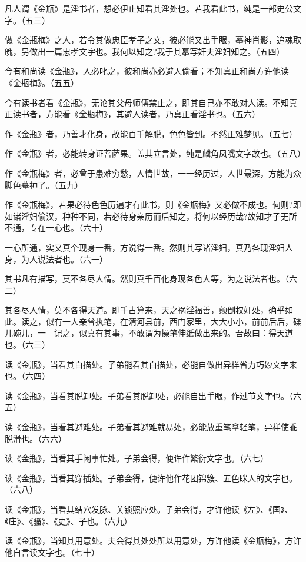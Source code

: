 \begin{showcontents}{}
{凡人谓《金瓶》是淫书者，想必伊止知看其淫处也。若我看此书，纯是一部史公文字。（五三）

做《金瓶梅》之人，若令其做忠臣孝子之文，彼必能又出手眼，摹神肖影，追魂取魄，另做出一篇忠孝文字也。我何以知之?我于其摹写奸夫淫妇知之。（五四）

今有和尚读《金瓶》，人必叱之，彼和尚亦必避人偷看；不知真正和尚方许他读《金瓶梅》。（五五）

今有读书者看《金瓶》，无论其父母师傅禁止之，即其自己亦不敢对人读。不知真正读书者，方能看《金瓶梅》，其避人读者，乃真正看淫书也。（五六）

作《金瓶》者，乃善才化身，故能百千解脱，色色皆到。不然正难梦见。（五七）

作《金瓶》者，必能转身证菩萨果。盖其立言处，纯是麟角凤嘴文字故也。（五八）

作《金瓶梅》者，必曾于患难穷愁，人情世故，一一经历过，人世最深，方能为众脚色摹神了。（五九）

作《金瓶梅》，若果必待色色历遍才有此书，则《金瓶梅》又必做不成也。何则?即如诸淫妇偷汉，种种不同，若必待身亲历而后知之，将何以经历哉?故知才子无所不通，专在一心也。（六十）

一心所通，实又真个现身一番，方说得一番。然则其写诸淫妇，真乃各现淫妇人身，为人说法者也。（六一）

其书凡有描写，莫不各尽人情。然则真千百化身现各色人等，为之说法者也。（六二）

其各尽人情，莫不各得天道。即千古算来，天之祸淫福善，颠倒权奸处，确乎如此。读之，似有一人亲曾执笔，在清河县前，西门家里，大大小小，前前后后，碟儿碗儿，一—记之，似真有其事，不敢谓为操笔伸纸做出来的。吾故曰：得天道也。（六三）

读《金瓶》，当看其白描处。子弟能看其白描处，必能自做出异样省力巧妙文字来也。（六四）

读《金瓶》，当看其脱卸处。子弟看其脱卸处，必能自出手眼，作过节文字也。（六五）

读《金瓶》，当看其避难处。子弟看其避难就易处，必能放重笔拿轻笔，异样使乖脱滑也。（六六）

读《金瓶》，当看其手闲事忙处。子弟会得，便许作繁衍文字也。（六七）

读《金瓶》，当看其穿插处。子弟会得，便许他作花团锦簇、五色眯人的文字也。（六八）

读《金瓶》，当看其结穴发脉、关锁照应处。子弟会得，才许他读《左》、《国》、《庄》、《骚》、《史》、子也。（六九）

读《金瓶》，当知其用意处。夫会得其处处所以用意处，方许他读《金瓶梅》，方许他自言读文字也。（七十）

}
\end{showcontents}
